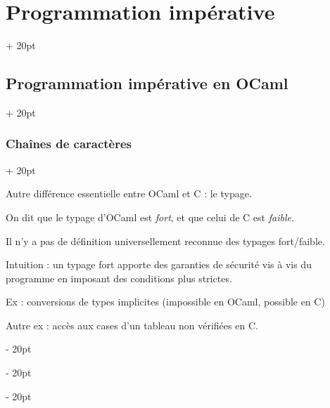 \documentclass[a4paper, 12pt, twoside]{article}
\newcommand{\ind}[1][20pt]{\advance\leftskip + #1}
\newcommand{\deind}[1][20pt]{\advance\leftskip - #1}
\newenvironment{indentedenv}[1][20pt]{\par \ind[#1]}{\par \deind}
\newenvironment{indt}[2][20pt]{#2 \begin{indentedenv}[#1]}{\end{indentedenv}} %
\begin{document}
\begin{indt}{\section{Programmation impérative}}
\begin{indt}{\subsection{Programmation impérative en OCaml}}
\begin{indt}{\subsubsection{Chaînes de caractères}}
                \vspace{6pt}
                
                Autre différence essentielle entre OCaml et C : le typage.
                
                On dit que le typage d'OCaml est \textit{fort}, et que celui de C est \textit{faible}.
                
                Il n'y a pas de définition universellement reconnue des typages fort/faible.
                
                Intuition : un typage fort apporte des garanties de sécurité vis à vis du programme en imposant des conditions plus strictes.
                
                Ex : conversions de types implicites (impossible en OCaml, possible en C)
                
                Autre ex : accès aux cases d'un tableau non vérifiées en C.
            \end{indt}
            
        \end{indt}
        
    \end{indt}


    

    
    
\end{document}

